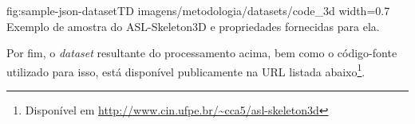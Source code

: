\figura
    {fig:sample-json-datasetTD} %
    {imagens/metodologia/datasets/code_3d} %
    {width=0.7\linewidth} %
    {Exemplo de amostra do ASL-Skeleton3D e propriedades fornecidas para ela.} %
    {} %

Por fim, o \textit{dataset} resultante do processamento acima, bem como o código-fonte utilizado para isso, está disponível publicamente na URL listada abaixo\footnote{Disponível em \url{http://www.cin.ufpe.br/~cca5/asl-skeleton3d}}.
